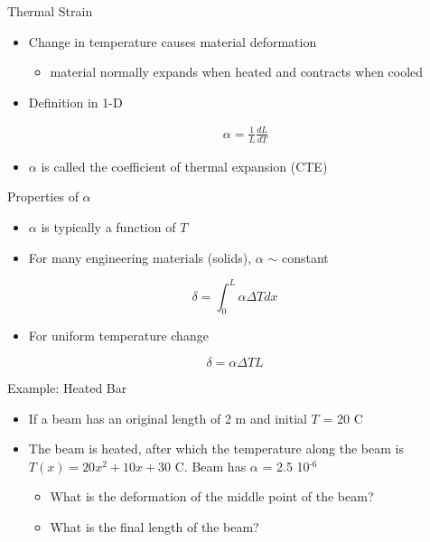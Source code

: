 \documentclass[10pt, svgnames]{beamer}
\begin{document}
\begin{frame}[label={sec:org7644411}]{Thermal Strain}
\begin{itemize}
\item Change in temperature causes material deformation

\begin{itemize}
\item material normally expands when heated and contracts when cooled
\end{itemize}

\item Definition in 1-D

\begin{align*}
  \alpha = \frac{1}{L} \frac{d L}{dT}
\end{align*}

\item \(\alpha\) is called the coefficient of thermal expansion (CTE)
\end{itemize}
\end{frame}

\begin{frame}[label={sec:org71d85e4}]{Properties of \(\alpha\)}
\begin{itemize}
\item \(\alpha\) is typically a function of \(T\)

\item For many engineering materials (solids), \(\alpha\) \(\sim\) constant
\end{itemize}

\[\delta = \int_0^L \alpha \Delta T dx\]

\begin{itemize}
\item For uniform temperature change
\end{itemize}

\[\delta = \alpha \Delta T L\]
\end{frame}

\begin{frame}[label={sec:org0320bfe}]{Example: Heated Bar}
\begin{itemize}
\item If a beam has an original length of 2 m and initial \(T\) = 20 C

\item The beam is heated, after which the temperature along the beam is
\(T(x) = 20 x^2 + 10x + 30\) C. Beam has \(\alpha\) = 2.5
10\(^{\text{-6}}\)

\begin{itemize}
\item What is the deformation of the middle point of the beam?

\item What is the final length of the beam?
\end{itemize}
\end{itemize}
\end{frame}
\end{document}
